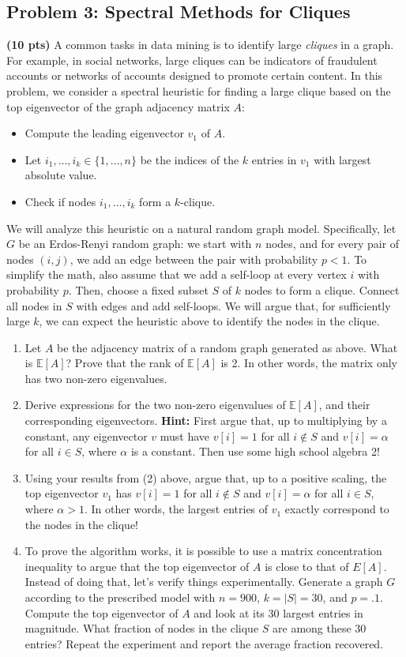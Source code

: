 \documentclass[10pt]{article}
\newcommand{\E}{\mathbb{E}}
\begin{document}
\subsection{Problem 3: Spectral Methods for Cliques} 
\textbf{(10 pts)} 
A common tasks in data mining is to identify large \emph{cliques} in a graph. For example, in social networks, large cliques can be indicators of fraudulent accounts or networks of accounts designed to promote certain content. In this problem, we consider a spectral heuristic for finding a large clique based on the top eigenvector of the graph adjacency matrix $A$: 
\begin{itemize}
	\item Compute the leading eigenvector $v_1$ of $A$. 
	\item Let $i_1, \ldots, i_k \in \{1, \ldots, n\}$ be the indices of the $k$ entries in $v_1$ with largest absolute value. 
	\item Check if nodes $i_1, \ldots, i_k$ form a $k$-clique.
\end{itemize}

We will analyze this heuristic on a natural random graph model. Specifically, let $G$ be an Erdos-Renyi random graph: we start with $n$ nodes, and for every pair of nodes $(i,j)$, we add an edge between the pair with probability $p < 1$. To simplify the math, also assume that we add a self-loop at every vertex $i$ with probability $p$. Then, choose a fixed subset $S$ of $k$ nodes to form a clique. Connect all nodes in $S$ with edges and add self-loops. We will argue that, for sufficiently large $k$, we can expect the heuristic above to identify the nodes in the clique. 

\begin{enumerate}
	\item Let $A$ be the adjacency matrix of a random graph generated as above. What is $\E[A]$? Prove that the rank of $\E[A]$ is 2. In other words, the matrix only has two non-zero eigenvalues.
	\item Derive expressions for the two non-zero eigenvalues of $\E[A]$, and their corresponding eigenvectors. \textbf{Hint:} First argue that, up to multiplying by a constant, any eigenvector $v$ must have $v[i] = 1$ for all $i \notin S$ and $v[i] = \alpha$ for all $i\in S$, where $\alpha$ is a constant. Then use some high school algebra 2!
	\item Using your results from (2) above, argue that, up to a positive scaling, the top eigenvector $v_1$ has $v[i] = 1$ for all $i \notin S$ and $v[i] = \alpha$ for all $i\in S$, where $\alpha > 1$. In other words, the largest entries of $v_1$ exactly correspond to the nodes in the clique!
	\item To prove the algorithm works, it is possible to use a matrix concentration inequality to argue that the top eigenvector of $A$ is close to that of $E[A]$. Instead of doing that, let's verify things experimentally. Generate a graph $G$ according to the prescribed model with $n = 900$, $k = 
	|S|= 30$, and $p = .1$. Compute the top eigenvector of $A$ and look at its 30 largest
	entries in magnitude. What fraction of nodes in the clique $S$ are among these 30 entries? Repeat the experiment and report the average fraction recovered. 
\end{enumerate}
\end{document}
